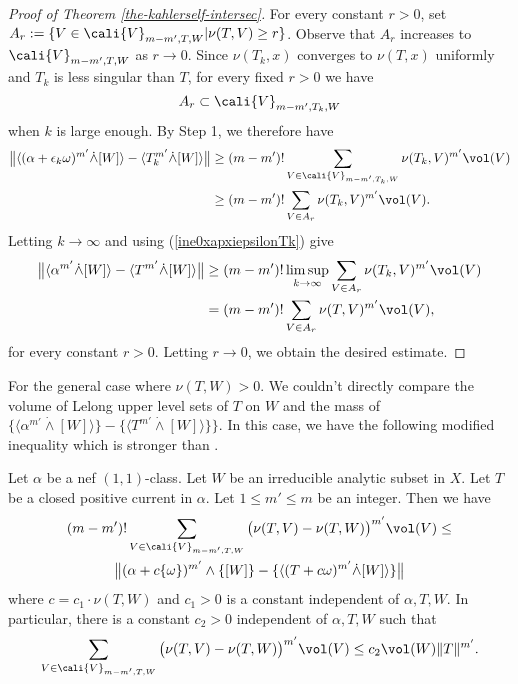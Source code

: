 \begin{proof}[Proof of Theorem \ref{the-kahlerself-intersec}]
        For every constant $r > 0$, set $A_{r}:= \{V \in \cali{V}_{m-m',T,W} | \nu(T,V) \geq r\}$. Observe that $A_r$ increases to $\cali{V}_{m-m',T,W}$ as $r \to 0$.  
        Since $\nu(T_k, x)$ converges to $\nu(T, x)$ uniformly and $T_k$ is less singular than $T$, for every fixed $r>0$ we have 
        \[  
            A_r \subset \cali{V}_{m-m',T_k,W} 
        \]
        when $k$ is large enough. By Step 1, we therefore have 
        \begin{align*}
            \big\|  \langle (\alpha+ \epsilon_k \omega)^{m'} \dot{\wedge} [W]\rangle- \langle T_k^{m'} \dot{\wedge} [W] \rangle \big \|
            &\geq (m-m')!\sum_{V \in \cali{V}_{m-m', T_k,W}} \nu(T_k,V)^{m'} \vol(V)\\
            &\geq (m-m')!\sum_{V \in A_r} \nu(T_k,V)^{m'} \vol(V).
        \end{align*}
        Letting $k \to \infty$ and using (\ref{ine0xapxiepsilonTk}) give
        \begin{align*}             \big\|  \langle \alpha^{m'} \dot{\wedge} [W]\rangle- \langle T^{m'} \dot{\wedge} [W] \rangle \big \| &
            \geq (m-m')! \limsup_{k \to \infty}  \sum_{V \in A_{r}} \nu(T_k,V)^{m'} \vol(V)\\ 
            &= (m-m')! \sum_{V \in A_{r}} \nu(T,V)^{m'} \vol(V),
        \end{align*}
        for every constant $r>0$. Letting $r \to 0$, we obtain the desired estimate.  
    \end{proof}




    For the general case where $\nu(T,W)>0$. We couldn't directly compare the volume of Lelong upper level sets of $T$ on $W$ and the mass of $\{\langle \alpha^{m'} \dot{\wedge} [W] \rangle \}-\{\langle T^{m'} \dot{\wedge} [W] \rangle\}\}$. In this case, we have the following modified inequality which is stronger than \cite[Theorem 1.1]{Do-Vu-lelong}.

    \begin{theorem} \label{th-khisolelongWduong}
        Let $\alpha$ be a nef $(1,1)$-class. Let $W$ be an irreducible analytic subset in $X$.  Let $T$ be a closed positive current in $\alpha$. Let $1\le m' \le m$ be an integer.  Then we have
        \begin{multline}\label{ine-vTWduong}
            (m-m')! \sum_{V \in \cali{V}_{m-m',T,W}} \big( \nu(T,V) -\nu(T,W) \big)^{m'} \vol(V) \leq \\
            \big{\|} (\alpha+c \{\omega\})^{m'} \wedge \{[W]\} - \{ \langle (T+c \omega)^{m'} \dot{\wedge} [W] \rangle\}  \big{\|}
        \end{multline}
        where $c= c_1 \cdot \nu(T,W)$ and $c_1>0$ is a constant independent of $\alpha,T,W$. In particular, there is a constant $c_2>0$ independent of $\alpha, T,W$ such that 
        \begin{align} \label{ine-vTWduong2}
            \sum_{V \in \cali{V}_{m-m',T,W}} \big( \nu(T,V) -\nu(T,W) \big)^{m'} \vol(V) \le c_2 \vol(W) \|T\|^{m'}.
        \end{align}
    \end{theorem}




